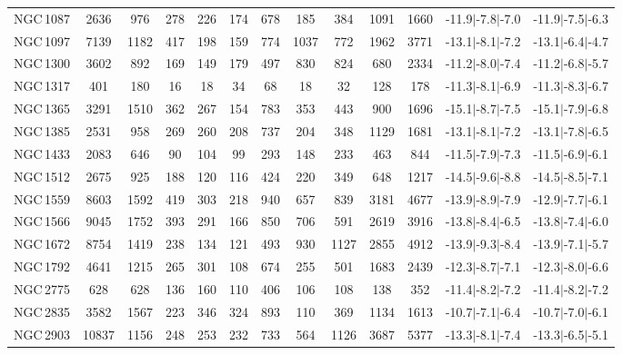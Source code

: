 \documentclass[linenumbers]{aastex63}
\begin{document}
\begin{table*}
\begin{center}
\begin{tabular}{lcccccccccccc}
NGC\,1087 & 2636 & 976 & 278 & 226 & 174 & 678 & 185 & 384 & 1091 & 1660 & -11.9$\vert$-7.8$\vert$-7.0 & -11.9$\vert$-7.5$\vert$-6.3 \\ 
NGC\,1097 & 7139 & 1182 & 417 & 198 & 159 & 774 & 1037 & 772 & 1962 & 3771 & -13.1$\vert$-8.1$\vert$-7.2 & -13.1$\vert$-6.4$\vert$-4.7 \\ 
NGC\,1300 & 3602 & 892 & 169 & 149 & 179 & 497 & 830 & 824 & 680 & 2334 & -11.2$\vert$-8.0$\vert$-7.4 & -11.2$\vert$-6.8$\vert$-5.7 \\ 
NGC\,1317 & 401 & 180 & 16 & 18 & 34 & 68 & 18 & 32 & 128 & 178 & -11.3$\vert$-8.1$\vert$-6.9 & -11.3$\vert$-8.3$\vert$-6.7 \\ 
NGC\,1365 & 3291 & 1510 & 362 & 267 & 154 & 783 & 353 & 443 & 900 & 1696 & -15.1$\vert$-8.7$\vert$-7.5 & -15.1$\vert$-7.9$\vert$-6.8 \\ 
NGC\,1385 & 2531 & 958 & 269 & 260 & 208 & 737 & 204 & 348 & 1129 & 1681 & -13.1$\vert$-8.1$\vert$-7.2 & -13.1$\vert$-7.8$\vert$-6.5 \\ 
NGC\,1433 & 2083 & 646 & 90 & 104 & 99 & 293 & 148 & 233 & 463 & 844 & -11.5$\vert$-7.9$\vert$-7.3 & -11.5$\vert$-6.9$\vert$-6.1 \\ 
NGC\,1512 & 2675 & 925 & 188 & 120 & 116 & 424 & 220 & 349 & 648 & 1217 & -14.5$\vert$-9.6$\vert$-8.8 & -14.5$\vert$-8.5$\vert$-7.1 \\ 
NGC\,1559 & 8603 & 1592 & 419 & 303 & 218 & 940 & 657 & 839 & 3181 & 4677 & -13.9$\vert$-8.9$\vert$-7.9 & -12.9$\vert$-7.7$\vert$-6.1 \\ 
NGC\,1566 & 9045 & 1752 & 393 & 291 & 166 & 850 & 706 & 591 & 2619 & 3916 & -13.8$\vert$-8.4$\vert$-6.5 & -13.8$\vert$-7.4$\vert$-6.0 \\ 
NGC\,1672 & 8754 & 1419 & 238 & 134 & 121 & 493 & 930 & 1127 & 2855 & 4912 & -13.9$\vert$-9.3$\vert$-8.4 & -13.9$\vert$-7.1$\vert$-5.7 \\ 
NGC\,1792 & 4641 & 1215 & 265 & 301 & 108 & 674 & 255 & 501 & 1683 & 2439 & -12.3$\vert$-8.7$\vert$-7.1 & -12.3$\vert$-8.0$\vert$-6.6 \\ 
NGC\,2775 & 628 & 628 & 136 & 160 & 110 & 406 & 106 & 108 & 138 & 352 & -11.4$\vert$-8.2$\vert$-7.2 & -11.4$\vert$-8.2$\vert$-7.2 \\ 
NGC\,2835 & 3582 & 1567 & 223 & 346 & 324 & 893 & 110 & 369 & 1134 & 1613 & -10.7$\vert$-7.1$\vert$-6.4 & -10.7$\vert$-7.0$\vert$-6.1 \\ 
NGC\,2903 & 10837 & 1156 & 248 & 253 & 232 & 733 & 564 & 1126 & 3687 & 5377 & -13.3$\vert$-8.1$\vert$-7.4 & -13.3$\vert$-6.5$\vert$-5.1 \\ 

\end{tabular}
\end{center}
\end{table*}
\end{document}
